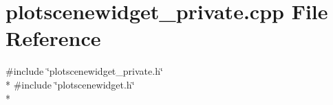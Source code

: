 \section{plotscenewidget\+\_\+private.\+cpp File Reference}
\label{bk3_2plotscenewidget__private_8cpp}
{\ttfamily \#include \char`\"{}plotscenewidget\+\_\+private.\+h\char`\"{}}\\*
{\ttfamily \#include \char`\"{}plotscenewidget.\+h\char`\"{}}\\*
